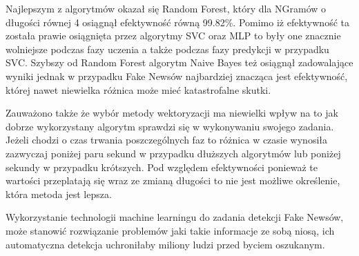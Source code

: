 Najlepszym z algorytmów okazał się Random Forest, który dla NGramów o długości równej 4
osiągnął efektywność równą 99.82\%. Pomimo iż efektywność ta została prawie osiągnięta przez algorytmy
SVC oraz MLP to były one znacznie wolniejsze podczas fazy uczenia a także podczas fazy 
predykcji w przypadku SVC. Szybszy od Random Forest algorytm Naive Bayes też osiągnął zadowalające wyniki
jednak w przypadku Fake Newsów najbardziej znacząca jest efektywność, której nawet niewielka różnica
może mieć katastrofalne skutki.  

Zauważono także że wybór metody wektoryzacji ma niewielki wpływ na to jak dobrze wykorzystany algorytm 
sprawdzi się w wykonywaniu swojego zadania. Jeżeli chodzi o czas trwania poszczególnych faz to 
różnica w czasie wynosiła zazwyczaj poniżej paru sekund w przypadku dłuższych algorytmów lub poniżej 
sekundy w przypadku krótszych. Pod względem efektywności ponieważ te wartości przeplatają się
wraz ze zmianą długości to nie jest możliwe określenie, która metoda jest lepsza.

Wykorzystanie technologii machine learningu do zadania detekcji Fake Newsów, 
może stanowić rozwiązanie problemów jaki takie informacje ze sobą niosą, ich automatyczna 
detekcja uchroniłaby miliony ludzi przed byciem oszukanym. 
